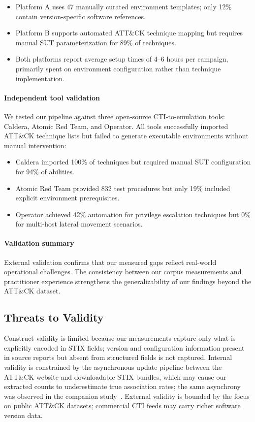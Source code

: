 \documentclass[sigconf,anonymous,review]{acmart}
\begin{document}
\begin{itemize}
\item Platform A uses 47 manually curated environment templates; only 12\% contain version-specific software references.
\item Platform B supports automated ATT\&CK technique mapping but requires manual SUT parameterization for 89\% of techniques.
\item Both platforms report average setup times of 4--6 hours per campaign, primarily spent on environment configuration rather than technique implementation.
\end{itemize}

\paragraph{Independent tool validation}

We tested our pipeline against three open-source CTI-to-emulation tools: Caldera, Atomic Red Team, and Operator. All tools successfully imported ATT\&CK technique lists but failed to generate executable environments without manual intervention:

\begin{itemize}
\item Caldera imported 100\% of techniques but required manual SUT configuration for 94\% of abilities.
\item Atomic Red Team provided 832 test procedures but only 19\% included explicit environment prerequisites.
\item Operator achieved 42\% automation for privilege escalation techniques but 0\% for multi-host lateral movement scenarios.
\end{itemize}

\paragraph{Validation summary}

External validation confirms that our measured gaps reflect real-world operational challenges. The consistency between our corpus measurements and practitioner experience strengthens the generalizability of our findings beyond the ATT\&CK dataset.

\subsection{Threats to Validity}

Construct validity is limited because our measurements capture only what is explicitly encoded in STIX fields; version and configuration information present in source reports but absent from structured fields is not captured. Internal validity is constrained by the asynchronous update pipeline between the ATT\&CK website and downloadable STIX bundles, which may cause our extracted counts to underestimate true association rates; the same asynchrony was observed in the companion study~\cite{ferraz2026proceduralsemanticsgapstructured}. External validity is bounded by the focus on public ATT\&CK datasets; commercial CTI feeds may carry richer software version data.
\end{document}
